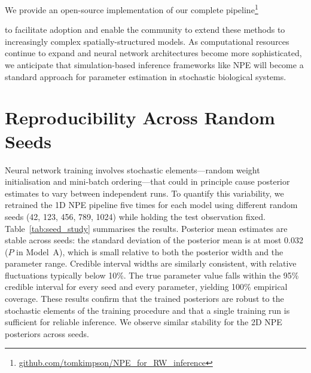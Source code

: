 \documentclass{article}
\providecommand{\DIFaddtex}[1]{{\protect\color{blue} \sf #1}} %
\providecommand{\DIFdeltex}[1]{{\protect\color{red} \scriptsize #1}} %
\providecommand{\DIFaddbegin}{} %
\providecommand{\DIFaddend}{} %
\providecommand{\DIFdelbegin}{} %
\providecommand{\DIFdelend}{} %
\providecommand{\DIFadd}[1]{\texorpdfstring{\DIFaddtex{#1}}{#1}} %
\providecommand{\DIFdel}[1]{\texorpdfstring{\DIFdeltex{#1}}{}} %
\newcommand{\DIFscaledelfig}{0.5}
\newlength{\DIFdelgraphicswidth} %
\newlength{\DIFdelgraphicsheight} %
\newcommand{\DIFaddincludegraphics}[2][]{{\color{blue}\fbox{\DIFOincludegraphics[#1]{#2}}}} %
\newcommand{\DIFdelincludegraphics}[2][]{%
\sbox{\DIFdelgraphicsbox}{\DIFOincludegraphics[#1]{#2}}%
\settoboxwidth{\DIFdelgraphicswidth}{\DIFdelgraphicsbox} %
\settoboxtotalheight{\DIFdelgraphicsheight}{\DIFdelgraphicsbox} %
\scalebox{\DIFscaledelfig}{%
\parbox[b]{\DIFdelgraphicswidth}{\usebox{\DIFdelgraphicsbox}\\[-\baselineskip] \rule{\DIFdelgraphicswidth}{0em}}\llap{\resizebox{\DIFdelgraphicswidth}{\DIFdelgraphicsheight}{%
\setlength{\unitlength}{\DIFdelgraphicswidth}%
\begin{picture}(1,1)%
\thicklines\linethickness{2pt} %
{\color[rgb]{1,0,0}\put(0,0){\framebox(1,1){}}}%
{\color[rgb]{1,0,0}\put(0,0){\line( 1,1){1}}}%
{\color[rgb]{1,0,0}\put(0,1){\line(1,-1){1}}}%
\end{picture}%
}\hspace*{3pt}}} %
} %
\DeclareRobustCommand{\DIFaddbegin}{\DIFOaddbegin \let\includegraphics\DIFaddincludegraphics} %
\DeclareRobustCommand{\DIFaddend}{\DIFOaddend \let\includegraphics\DIFOincludegraphics} %
\DeclareRobustCommand{\DIFdelbegin}{\DIFOdelbegin \let\includegraphics\DIFdelincludegraphics} %
\DeclareRobustCommand{\DIFdelend}{\DIFOaddend \let\includegraphics\DIFOincludegraphics} %
\begin{document}
\DIFdelbegin \DIFdel{We provide an open-source implementation of our complete pipeline}\footnote{\href{https://github.com/tomkimpson/NPE_for_RW_inference}{\DIFdel{github.com/tomkimpson/NPE\_for\_RW\_inference}}%
} %
\addtocounter{footnote}{-1}%
\DIFdel{to facilitate adoption and enable the community to extend these methods to increasingly complex spatially-structured models. As computational resources continue to expand and neural network architectures become more sophisticated, we anticipate that simulation-based inference frameworks like NPE will become a standard approach for parameter estimation in stochastic biological systems. }\DIFdelend \DIFaddbegin \section{\DIFadd{Reproducibility Across Random Seeds}}\label{sec:reproducibility}
\DIFaddend 

\DIFdelbegin %
\DIFdelend \DIFaddbegin \DIFadd{Neural network training involves stochastic elements---random weight initialisation and mini-batch ordering---that could in principle cause posterior estimates to vary between independent runs. To quantify this variability, we retrained the 1D NPE pipeline five times for each model using different random seeds (42, 123, 456, 789, 1024) while holding the test observation fixed. Table~\ref{tab:seed_study} summarises the results. Posterior mean estimates are stable across seeds: the standard deviation of the posterior mean is at most 0.032 ($P$ in Model~A), which is small relative to both the posterior width and the parameter range. Credible interval widths are similarly consistent, with relative fluctuations typically below 10\%. The true parameter value falls within the 95\% credible interval for every seed and every parameter, yielding 100\% empirical coverage. These results confirm that the trained posteriors are robust to the stochastic elements of the training procedure and that a single training run is sufficient for reliable inference. We observe similar stability for the 2D NPE posteriors across seeds.
}\DIFaddend 
\end{document}
